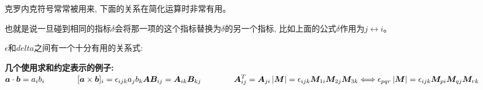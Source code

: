 克罗内克符号常常被用来, 下面的关系在简化运算时非常有用。
\begin{lequation}
\end{lequation}

也就是说一旦碰到相同的指标$\delta$会将那一项的这个指标替换为$\delta$的另一个指标, 比如上面的公式$\delta$作用为$j\leftrightarrow i$。

$\epsilon$和$delta$之间有一个十分有用的关系式:
\begin{lequation}
\end{lequation}
\begin{thinknote}
    \textbf{几个使用求和约定表示的例子:}\\
    \begin{math}
        \displaystyle
        \bm{a}\cdot\bm{b}=a_ib_i \qquad\qquad [\bm{a}\times\bm{b}]_i=\epsilon_{ijk}a_jb_k\\
        \bm{A}\bm{B}_{ij}=\bm{A}_{ik}\bm{B}_{kj} \qquad\qquad \bm{A}^{T}_{ij}=\bm{A}_{ji}\\
        \left|\bm{M}\right| =\epsilon_{ijk}\bm{M}_{1i}\bm{M}_{2j}\bm{M}_{3k}\Longleftrightarrow \epsilon_{pqr}\left|\bm{M}\right|=\epsilon_{ijk}\bm{M}_{pi}\bm{M}_{qj}\bm{M}_{rk}
    \end{math}
\end{thinknote}
